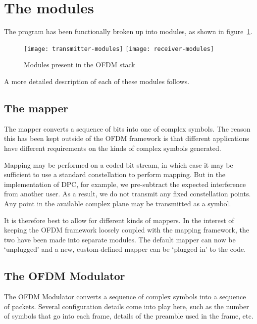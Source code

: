 \section{The modules}

The program has been functionally broken up into modules, as shown in
figure~\ref{fig:modules}.

\begin{figure}[h]
	\centering
	\texttt{[image: transmitter-modules]}
	\texttt{[image: receiver-modules]}
	\caption{Modules present in the OFDM stack}
	\label{fig:modules}
\end{figure}

A more detailed description of each of these modules follows.

\subsection{The mapper}

The mapper converts a sequence of bits into one of complex symbols. The reason
this has been kept outside of the OFDM framework is that different applications
have different requirements on the kinds of complex symbols generated.

Mapping may be performed on a coded bit stream, in which case it may be
sufficient to use a standard constellation to perform mapping. But in the
implementation of DPC, for example, we pre-subtract the expected interference
from another user. As a result, we do not transmit any fixed constellation
points. Any point in the available complex plane may be transmitted as a
symbol.

It is therefore best to allow for different kinds of mappers. In the interest
of keeping the OFDM framework loosely coupled with the mapping framework, the
two have been made into separate modules. The default mapper can now be
`unplugged' and a new, custom-defined mapper can be `plugged in' to the code.

\subsection{The OFDM Modulator}
\label{subsec:ofdm-modulator}

The OFDM Modulator converts a sequence of complex symbols into a sequence of
packets. Several configuration details come into play here, such as the number
of symbols that go into each frame, details of the preamble used in the frame,
etc.

